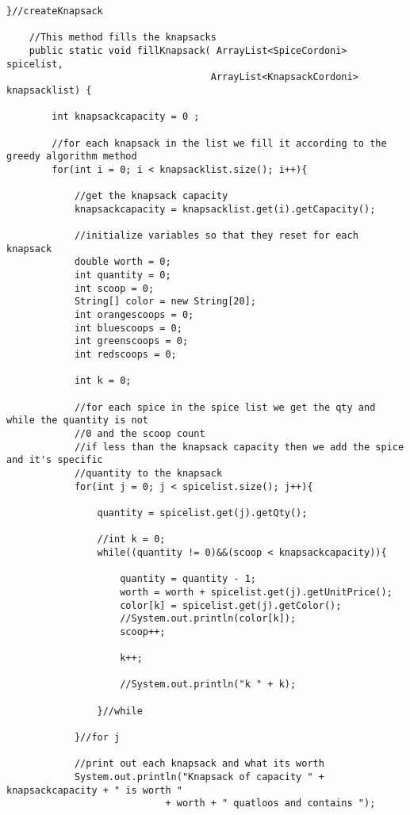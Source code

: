 \documentclass[letterpaper, 10pt,DIV=13]{scrartcl}
\numberwithin{equation}{section} %
\numberwithin{figure}{section} %
\numberwithin{table}{section} %
\begin{document}
\begin{lstlisting}[frame=single, ]
    }//createKnapsack

    //This method fills the knapsacks
    public static void fillKnapsack( ArrayList<SpiceCordoni> spicelist, 
                                    ArrayList<KnapsackCordoni> knapsacklist) {
 
        int knapsackcapacity = 0 ;

        //for each knapsack in the list we fill it according to the greedy algorithm method
        for(int i = 0; i < knapsacklist.size(); i++){

            //get the knapsack capacity 
            knapsackcapacity = knapsacklist.get(i).getCapacity();

            //initialize variables so that they reset for each knapsack
            double worth = 0;
            int quantity = 0;
            int scoop = 0;
            String[] color = new String[20];
            int orangescoops = 0;
            int bluescoops = 0;
            int greenscoops = 0;
            int redscoops = 0;
            
            int k = 0;

            //for each spice in the spice list we get the qty and while the quantity is not 
            //0 and the scoop count
            //if less than the knapsack capacity then we add the spice and it's specific 
            //quantity to the knapsack
            for(int j = 0; j < spicelist.size(); j++){

                quantity = spicelist.get(j).getQty();

                //int k = 0;
                while((quantity != 0)&&(scoop < knapsackcapacity)){
                       
                    quantity = quantity - 1;
                    worth = worth + spicelist.get(j).getUnitPrice();
                    color[k] = spicelist.get(j).getColor();
                    //System.out.println(color[k]);
                    scoop++;

                    k++;

                    //System.out.println("k " + k);

                }//while

            }//for j

            //print out each knapsack and what its worth
            System.out.println("Knapsack of capacity " + knapsackcapacity + " is worth " 
                            + worth + " quatloos and contains ");
            

\end{lstlisting}
\end{document}
